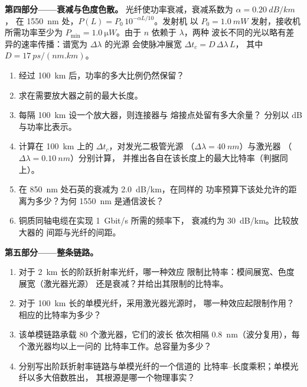 \begin{problem}
\medskip
\noindent\textbf{第四部分——衰减与色度色散。}
光纤使功率衰减，衰减系数为 $\alpha = \qty{0.20}{dB/km}$，
在 \qty{1550}{nm} 处，$P(L) = P_0\,10^{-\alpha L/10}$。发射机
以 $P_0 = \qty{1.0}{mW}$ 发射，接收机所需功率至少为
$P_{\min} = \qty{1.0}{\micro W}$。由于 $n$ 依赖于 $\lambda$，两种
波长不同的光以略有差异的速率传播：谱宽为 $\Delta\lambda$ 的光源
会使脉冲展宽 $\Delta t_c = D\,\Delta\lambda\,L$，
其中 $D = \qty{17}{ps/(nm.km)}$。
\begin{enumerate}[resume]
  \item 经过 \qty{100}{km} 后，功率的多大比例仍然保留？
  \item 求在需要放大器之前的最大长度。
  \item 每隔 \qty{100}{km} 设一个放大器，则连接器与
        熔接点处留有多大余量？
        分别以 dB 与功率比表示。
  \item 计算在 \qty{100}{km} 上的 $\Delta t_c$，对发光二极管光源
        （$\Delta\lambda = \qty{40}{nm}$）与激光器
        （$\Delta\lambda = \qty{0.10}{nm}$）分别计算，
        并推出各自在该长度上的最大比特率（判据同上）。
  \item 在 \qty{850}{nm} 处石英的衰减为 \qty{2.0}{dB/km}，在同样的
        功率预算下该处允许的距离为多少？为何
        \qty{1550}{nm} 是通信波长？
  \item 铜质同轴电缆在实现 \qty{1}{Gbit/s} 所需的频率下，
        衰减约为 \qty{30}{dB/km}。比较放大器的
        间距与光纤的间距。
\end{enumerate}

\medskip
\noindent\textbf{第五部分——整条链路。}
\begin{enumerate}[resume]
  \item 对于 \qty{2}{km} 长的阶跃折射率光纤，哪一种效应
        限制比特率：模间展宽、色度展宽（激光器光源）
        还是衰减？并给出其限制的比特率。
  \item 对于 \qty{100}{km} 长的单模光纤，采用激光器光源时，
        哪一种效应起限制作用？相应的比特率为多少？
  \item 该单模链路承载 $80$ 个激光器，它们的波长
        依次相隔 \qty{0.8}{nm}（波分复用），每个激光器均以上一问的
        比特率工作。总容量为多少？
  \item 分别写出阶跃折射率链路与单模光纤的一个信道的
        比特率–长度乘积；单模光纤以多大倍数胜出，
        其根源是哪一个物理事实？
\end{enumerate}
\end{problem}
